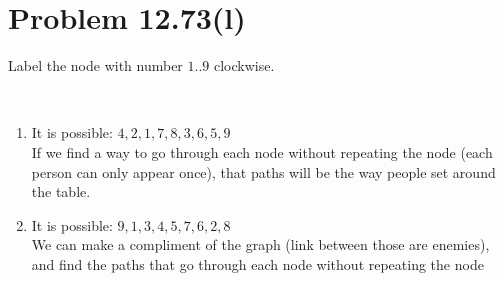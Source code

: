 \documentclass{article}
\def\math#1{$#1$}
\begin{document}
\section{Problem 12.73(l)}

Label the node with number \math{1..9} clockwise. \\

 \\

\begin{enumerate}
    \item It is possible: \math{4, 2, 1, 7, 8, 3, 6, 5, 9} \\
    If we find a way to go through each node without repeating the node (each person can only appear once), that paths will be the way people set around the table.
    \item It is possible: \math{9, 1, 3, 4, 5, 7, 6, 2, 8} \\
    We can make a compliment of the graph (link between those are enemies), and find the paths that go through each node without repeating the node
\end{enumerate}
\end{document}
